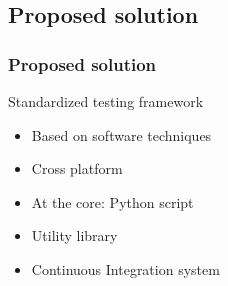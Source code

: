 \documentclass[british,10pt]{beamer}
\begin{document}
\subsection{Proposed solution}

\begin{frame}\frametitle{Proposed solution}
Standardized testing framework
\begin{itemize}
\item Based on software techniques
\item Cross platform
\item At the core: Python script
\item Utility library
\item Continuous Integration system
\end{itemize}
\end{frame}




\end{document}

